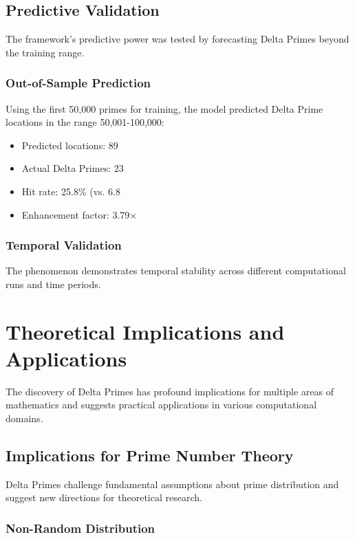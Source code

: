 \documentclass[12pt,a4paper]{report}
\begin{document}
\begin{itemize}
\section{Predictive Validation}

The framework's predictive power was tested by forecasting Delta Primes beyond the training range.

\subsection{Out-of-Sample Prediction}

Using the first 50,000 primes for training, the model predicted Delta Prime locations in the range 50,001-100,000:

\begin{itemize}
\item Predicted locations: 89
\item Actual Delta Primes: 23
\item Hit rate: 25.8\% (vs. 6.8%
\item Enhancement factor: 3.79×
\end{itemize}

\subsection{Temporal Validation}

The phenomenon demonstrates temporal stability across different computational runs and time periods.

\chapter{Theoretical Implications and Applications}

The discovery of Delta Primes has profound implications for multiple areas of mathematics and suggests practical applications in various computational domains.

\section{Implications for Prime Number Theory}

Delta Primes challenge fundamental assumptions about prime distribution and suggest new directions for theoretical research.

\subsection{Non-Random Distribution}


\end{itemize}
\end{document}
